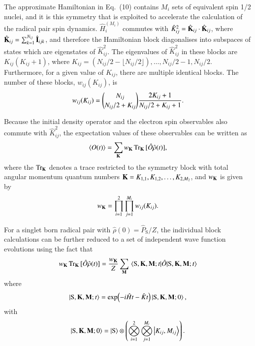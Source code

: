 \documentclass[%
aip,
jcp,%
amsmath,amssymb,
reprint%
]{revtex4-1}
\newcommand{\sing}{\ensuremath{\mathrm{S}}}
\renewcommand{\op}[1]{\ensuremath{\hat{#1}}}
\begin{document}
The approximate Hamiltonian in Eq.~(10) contains $M_i$ sets of equivalent spin 1/2 nuclei, and it is this symmetry that is exploited to accelerate the calculation of the radical pair spin dynamics. $\op{H}_i^{(M_i)}$ commutes with $\op{K}_{ij}^2 = \op{\vb{K}}_{ij}\cdot\op{\vb{K}}_{ij}$, where $\op{\vb{K}}_{ij} = \sum_{k=1}^{N_{ij}} \op{\vb{I}}_{ijk}$, and therefore the Hamiltonian block diagonalises into subspaces of states which are eigenstates of $\op{K}_{ij}^2$. The eigenvalues of $\op{K}_{ij}^2$ in these blocks are $K_{ij}(K_{ij}+1)$, where $K_{ij}=(N_{ij}/2 - \lfloor N_{ij}/2\rfloor),\ldots ,N_{ij}/2-1,N_{ij}/2 $. Furthermore, for a given value of $K_{ij}$, there are multiple identical blocks. The number of these blocks, $w_{ij}(K_{ij})$, is 
\begin{align}
  w_{ij}(K_{ij}) = {{N_{ij}}\choose {N_{ij}/2}+K_{ij}}{2K_{ij}+1\over N_{ij}/2+K_{ij}+1}.
\end{align}

Because the initial density operator and the electron spin observables also commute with $\op{K}_{ij}^2$, the expectation values of these observables can be written as
\begin{align}
  \ev{O(t)} = \sum_{\vb{K}} w_{\vb{K}} \Tr_{\vb{K}} {[\op{O}\op{\rho}(t)]},
\end{align}
where the $\Tr_{\vb{K}}$ denotes a trace restricted to the symmetry block with total angular momentum quantum numbers $\vb{K} = K_{1,1}, K_{1,2},\dots,K_{2,M_2}$, and $w_{\vb{K}}$ is given by
\begin{align}
  w_{\vb{K}} = \prod_{i=1}^2\prod_{j=1}^{M_i}w_{ij}(K_{ij}).
\end{align}

For a singlet born radical pair with $\op{\rho}(0) = \op{P}_\sing/Z$, the individual block calculations can be further reduced to a set of independent wave function evolutions using the fact that
\begin{align}
  w_{\vb{K}}\Tr_{\vb{K}} {[\op{O}\op{\rho}(t)]} = \frac{w_{\vb{K}}}{Z}\sum_{\vb{M}}\ev{\op{O}}{\sing,\vb{K},\vb{M};t}
\end{align}
where 
\begin{align}\label{evolved-state-eq}
  \ket{\sing,\vb{K},\vb{M};t} = \exp(-i\op{H}t-\op{K}t)\ket{\sing,\vb{K},\vb{M};0},
\end{align}
with
\begin{align}
  \ket{\sing,\vb{K},\vb{M};0}=\ket{\sing}\otimes\left(\bigotimes_{i=1}^2\bigotimes_{j=1}^{M_i}\ket{K_{ij},M_{ij}}\right).
  \end{align}
\end{document}
